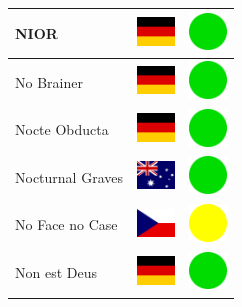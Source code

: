 \documentclass[12pt, a4paper, twoside]{report}
\begin{document}
\begin{center}
\begin{longtable}{|p{5cm}|p{2cm}|p{2cm}|}
 NIOR                                                       & \includegraphics[width=1cm]{../img/flags/de} &   \includegraphics[width=1cm]{../likes/y} \\ \hline
 No Brainer                                                 & \includegraphics[width=1cm]{../img/flags/de} &   \includegraphics[width=1cm]{../likes/y} \\ \hline
 Nocte Obducta                                              & \includegraphics[width=1cm]{../img/flags/de} &   \includegraphics[width=1cm]{../likes/y} \\ \hline
 Nocturnal Graves                                           & \includegraphics[width=1cm]{../img/flags/au} &   \includegraphics[width=1cm]{../likes/y} \\ \hline
 No Face no Case                                            & \includegraphics[width=1cm]{../img/flags/cz} &   \includegraphics[width=1cm]{../likes/m} \\ \hline
 Non est Deus                                               & \includegraphics[width=1cm]{../img/flags/de} &   \includegraphics[width=1cm]{../likes/y} \\ \hline

\end{longtable}
\end{center}
\end{document}
